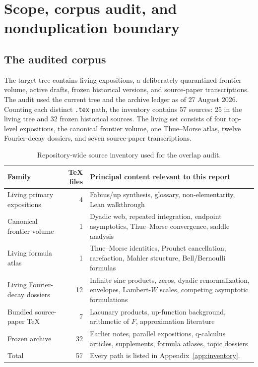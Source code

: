 \documentclass[11pt]{article}
\theoremstyle{definition}
\theoremstyle{remark}
\begin{document}
\tableofcontents
\clearpage
{}

\section{Scope, corpus audit, and nonduplication boundary}

\subsection{The audited corpus}

The target tree contains living expositions, a deliberately quarantined frontier volume, active drafts, frozen historical versions, and source-paper transcriptions. The audit used the current tree and the archive ledger as of 27 August 2026. Counting each distinct \texttt{.tex} path, the inventory contains 57 sources: 25 in the living tree and 32 frozen historical sources. The living set consists of four top-level expositions, the canonical frontier volume, one Thue--Morse atlas, twelve Fourier-decay dossiers, and seven source-paper transcriptions.

\begin{table}[htbp]
\centering
\caption{Repository-wide source inventory used for the overlap audit.}
\label{tab:inventory}
\begin{tabularx}{\textwidth}{@{}l r X@{}}
\toprule
Family & TeX files & Principal content relevant to this report \\
\midrule
Living primary expositions & 4 & Fabius/up synthesis, glossary, non-elementarity, Lean walkthrough \\
Canonical frontier volume & 1 & Dyadic web, repeated integration, endpoint asymptotics, Thue--Morse convergence, saddle analysis \\
Living formula atlas & 1 & Thue--Morse identities, Prouhet cancellation, rarefaction, Mahler structure, Bell/Bernoulli formulas \\
Living Fourier-decay dossiers & 12 & Infinite sinc products, zeros, dyadic renormalization, envelopes, Lambert-$W$ scales, competing asymptotic formulations \\
Bundled source-paper TeX & 7 & Lacunary products, up-function background, arithmetic of $F$, approximation literature \\
Frozen archive & 32 & Earlier notes, parallel expositions, q-calculus articles, supplements, formula atlases, topic dossiers \\
\midrule
Total & 57 & Every path is listed in Appendix~\ref{app:inventory}. \\
\bottomrule
\end{tabularx}
\end{table}
\end{document}
